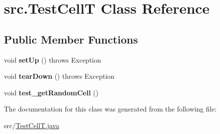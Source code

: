 \hypertarget{classsrc_1_1TestCellT}{}\section{src.\+Test\+CellT Class Reference}
\label{classsrc_1_1TestCellT}
\subsection*{Public Member Functions}
\begin{DoxyCompactItemize}
\item 
\mbox{\label{classsrc_1_1TestCellT_afb9d4824888ecc4414b2fc73a8cd9f97}} 
void {\bfseries set\+Up} ()  throws Exception 
\item 
\mbox{\label{classsrc_1_1TestCellT_a2c54c9121d6fe1963eea2c35b2dded97}} 
void {\bfseries tear\+Down} ()  throws Exception 
\item 
\mbox{\label{classsrc_1_1TestCellT_a18e8cadba915b50e663b4f4fb728cca2}} 
void {\bfseries test\+\_\+get\+Random\+Cell} ()
\end{DoxyCompactItemize}


The documentation for this class was generated from the following file\+:\begin{DoxyCompactItemize}
\item 
src/\hyperlink{TestCellT_8java}{Test\+Cell\+T.\+java}\end{DoxyCompactItemize}
